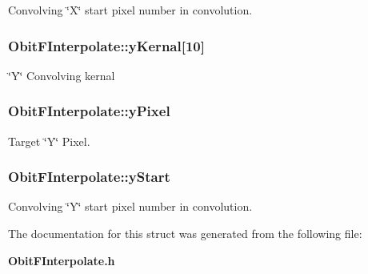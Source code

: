 Convolving \char`\"{}X\char`\"{} start pixel number in convolution. 

\subsubsection{ {\bf Obit\-FInterpolate::y\-Kernal}[10]}\label{structObitFInterpolate_o17}


\char`\"{}Y\char`\"{} Convolving kernal 

\subsubsection{ {\bf Obit\-FInterpolate::y\-Pixel}}\label{structObitFInterpolate_o13}


Target \char`\"{}Y\char`\"{} Pixel. 

\subsubsection{ {\bf Obit\-FInterpolate::y\-Start}}\label{structObitFInterpolate_o15}


Convolving \char`\"{}Y\char`\"{} start pixel number in convolution. 



The documentation for this struct was generated from the following file:\begin{CompactItemize}
\item 
{\bf Obit\-FInterpolate.h}\end{CompactItemize}
